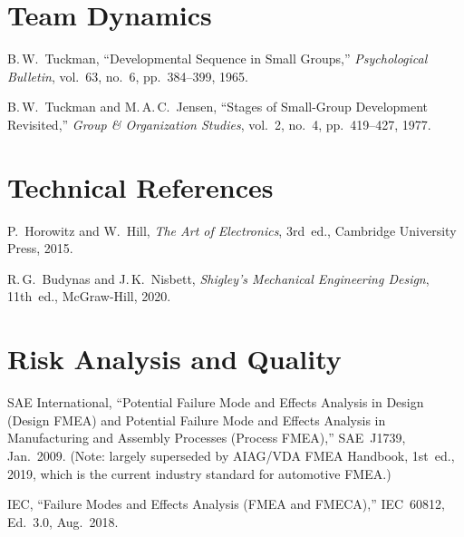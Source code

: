 \section*{Team Dynamics}
\begin{enumerate}[label={[\arabic*]},leftmargin=2em,resume]
\item B.\,W.~Tuckman, ``Developmental Sequence in Small Groups,'' \emph{Psychological Bulletin}, vol.~63, no.~6, pp.~384--399, 1965.
\item B.\,W.~Tuckman and M.\,A.\,C.~Jensen, ``Stages of Small-Group Development Revisited,'' \emph{Group \& Organization Studies}, vol.~2, no.~4, pp.~419--427, 1977.
\end{enumerate}

\section*{Technical References}
\begin{enumerate}[label={[\arabic*]},leftmargin=2em,resume]
\item P.~Horowitz and W.~Hill, \emph{The Art of Electronics}, 3rd~ed., Cambridge University Press, 2015.
\item R.\,G.~Budynas and J.\,K.~Nisbett, \emph{Shigley's Mechanical Engineering Design}, 11th~ed., McGraw-Hill, 2020.
\end{enumerate}

\section*{Risk Analysis and Quality}
\begin{enumerate}[label={[\arabic*]},leftmargin=2em,resume]
\item SAE International, ``Potential Failure Mode and Effects Analysis in Design (Design FMEA) and Potential Failure Mode and Effects Analysis in Manufacturing and Assembly Processes (Process FMEA),'' SAE~J1739, Jan.\ 2009. (Note: largely superseded by AIAG/VDA FMEA Handbook, 1st~ed., 2019, which is the current industry standard for automotive FMEA.)
\item IEC, ``Failure Modes and Effects Analysis (FMEA and FMECA),'' IEC~60812, Ed.~3.0, Aug.\ 2018.
\end{enumerate}

